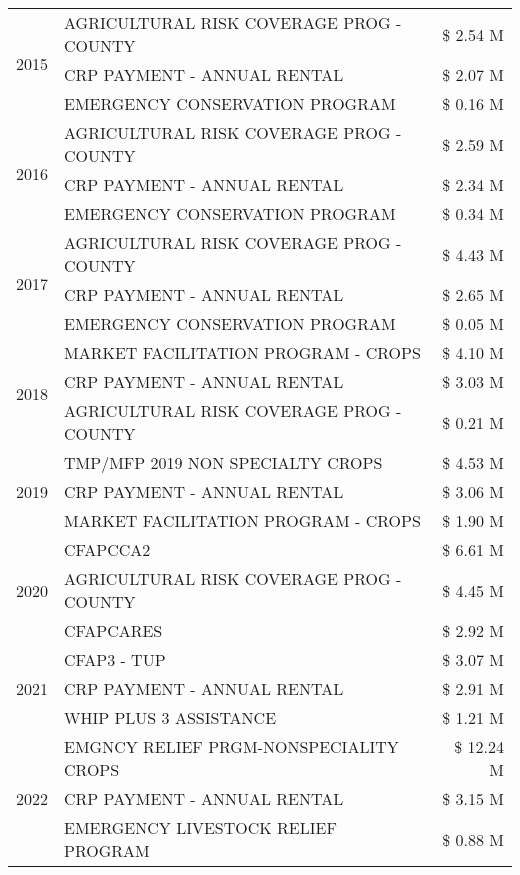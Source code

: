 \begin{tabular}{llr}
\multirow[t]{3}{*}{2015} & AGRICULTURAL RISK COVERAGE PROG - COUNTY & \$ 2.54 M \\
 & CRP PAYMENT - ANNUAL RENTAL & \$ 2.07 M \\
 & EMERGENCY CONSERVATION PROGRAM & \$ 0.16 M \\
\cline{1-3}
\multirow[t]{3}{*}{2016} & AGRICULTURAL RISK COVERAGE PROG - COUNTY & \$ 2.59 M \\
 & CRP PAYMENT - ANNUAL RENTAL & \$ 2.34 M \\
 & EMERGENCY CONSERVATION PROGRAM & \$ 0.34 M \\
\cline{1-3}
\multirow[t]{3}{*}{2017} & AGRICULTURAL RISK COVERAGE PROG - COUNTY & \$ 4.43 M \\
 & CRP PAYMENT - ANNUAL RENTAL & \$ 2.65 M \\
 & EMERGENCY CONSERVATION PROGRAM & \$ 0.05 M \\
\cline{1-3}
\multirow[t]{3}{*}{2018} & MARKET FACILITATION PROGRAM - CROPS & \$ 4.10 M \\
 & CRP PAYMENT - ANNUAL RENTAL & \$ 3.03 M \\
 & AGRICULTURAL RISK COVERAGE PROG - COUNTY & \$ 0.21 M \\
\cline{1-3}
\multirow[t]{3}{*}{2019} & TMP/MFP 2019 NON SPECIALTY CROPS & \$ 4.53 M \\
 & CRP PAYMENT - ANNUAL RENTAL & \$ 3.06 M \\
 & MARKET FACILITATION PROGRAM - CROPS & \$ 1.90 M \\
\cline{1-3}
\multirow[t]{3}{*}{2020} & CFAPCCA2 & \$ 6.61 M \\
 & AGRICULTURAL RISK COVERAGE PROG - COUNTY & \$ 4.45 M \\
 & CFAPCARES & \$ 2.92 M \\
\cline{1-3}
\multirow[t]{3}{*}{2021} & CFAP3 - TUP & \$ 3.07 M \\
 & CRP PAYMENT - ANNUAL RENTAL & \$ 2.91 M \\
 & WHIP PLUS 3 ASSISTANCE & \$ 1.21 M \\
\cline{1-3}
\multirow[t]{3}{*}{2022} & EMGNCY RELIEF PRGM-NONSPECIALITY CROPS & \$ 12.24 M \\
 & CRP PAYMENT - ANNUAL RENTAL & \$ 3.15 M \\
 & EMERGENCY LIVESTOCK RELIEF PROGRAM & \$ 0.88 M \\
\cline{1-3}
\bottomrule
\end{tabular}
